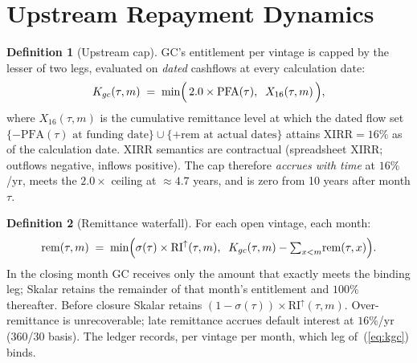 \documentclass[11pt, a4paper]{article}
\theoremstyle{definition}
\newtheorem{definition}{Definition}[section]
\newcommand{\src}[1]{}
\newcommand{\GCCIA}{upstream facility}
\newcommand{\PFA}{\mathrm{PFA}}                   %
\newcommand{\RIup}{\mathrm{RI}^{\uparrow}}        %
\newcommand{\rem}{\mathrm{rem}}                   %
\newcommand{\Kgc}{K_{gc}}                         %
\newcommand{\Xirr}{X_{16}}                        %
\begin{document}
\section{Upstream Repayment Dynamics}\label{sec:cap}

\begin{definition}[Upstream cap]\label{def:kgc}
GC's entitlement per vintage is capped by the lesser of two legs, evaluated on \emph{dated} cashflows at every calculation date:
\begin{equation}\label{eq:kgc}
\Kgc(\tau, m) \;=\; \min\Bigl(\, 2.0 \times \PFA(\tau), \;\; \Xirr(\tau, m) \,\Bigr),
\end{equation}
where $\Xirr(\tau, m)$ is the cumulative remittance level at which the dated flow set $\{-\PFA(\tau) \text{ at funding date}\} \cup \{+\rem \text{ at actual dates}\}$ attains $\mathrm{XIRR} = 16\%$ as of the calculation date. XIRR semantics are contractual (spreadsheet XIRR; outflows negative, inflows positive). The cap therefore \emph{accrues with time} at $16\%$/yr, meets the $2.0\times$ ceiling at $\approx 4.7$ years, and is zero from 10 years after month $\tau$.
\src{\GCCIA{} Sch.~A (``Investor Cap Amount'', ``Internal Rate of Return'').}
\end{definition}

\begin{definition}[Remittance waterfall]\label{def:remit}
For each open vintage, each month:
\begin{equation}\label{eq:remit}
\rem(\tau, m) \;=\; \min\Bigl( \sigma(\tau) \times \RIup(\tau, m), \;\; \Kgc(\tau, m) - {\textstyle\sum_{x < m}} \rem(\tau, x) \Bigr).
\end{equation}
In the closing month GC receives only the amount that exactly meets the binding leg; Skalar retains the remainder of that month's entitlement and $100\%$ thereafter. Before closure Skalar retains $(1 - \sigma(\tau)) \times \RIup(\tau, m)$. Over-remittance is unrecoverable; late remittance accrues default interest at $16\%$/yr (360/30 basis). The ledger records, per vintage per month, which leg of~(\ref{eq:kgc}) binds.
\src{\GCCIA{} \S2.2(a), \S9; Sch.~A (``Investor Sharing Percentage'').}
\end{definition}
\end{document}
